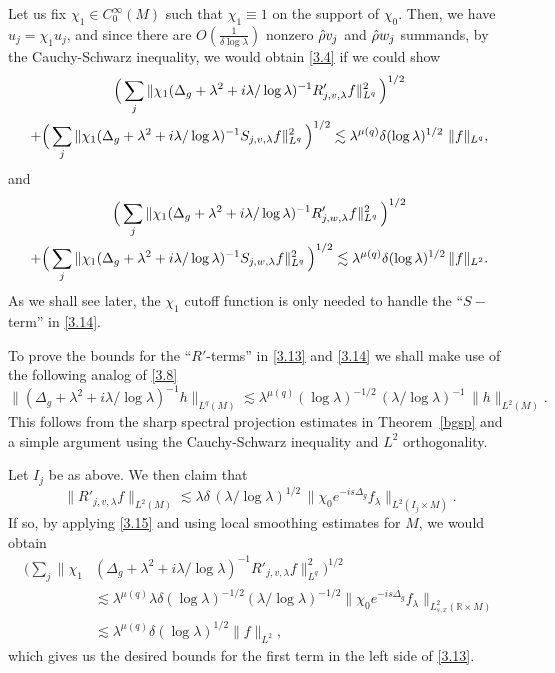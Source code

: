\documentclass[10pt]{amsart}
\newcommand{\la}{\lambda}
\newcommand{\1}{{\bf 1}}
\newcommand{\R}{{\mathbb R}}
\begin{document}
Let us fix $\chi_1\in C_0^\infty (M)$ such that $\chi_1\equiv 1$ on the support of $\chi_0$. Then, we have $u_j=\chi_1u_j$, and  
since there are $O(\frac{1}{\delta\log\la})$ nonzero $\Hat \rho v_j$ and $\Hat \rho w_j$ summands, by the Cauchy-Schwarz
inequality, we would obtain \eqref{3.4} if we could show
\begin{multline}\label{3.13}
\Bigl(\, \sum_j \|\chi_1(\Delta_g+\la^2+i\la/\log\la)^{-1} R'_{j,v,\la}f \|^2_{L^q} \, \Bigr)^{1/2}
\\+
\Bigl(\, \sum_j \|\chi_1(\Delta_g+\la^2+i\la/\log\la)^{-1} S_{j,v,\la}f \|^2_{L^q} \, \Bigr)^{1/2}
\lesssim \la^{\mu(q)}\delta(\log\la)^{1/2} \, \, \|f\|_{L^q},
\end{multline}
and
\begin{multline}\label{3.14}
\Bigl(\, \sum_j \|\chi_1(\Delta_g+\la^2+i\la/\log\la)^{-1} R'_{j,w,\la}f \|^2_{L^q} \, \Bigr)^{1/2}
\\+
\Bigl(\, \sum_j \|\chi_1(\Delta_g+\la^2+i\la/\log\la)^{-1} S_{j,w,\la}f \|^2_{L^q} \, \Bigr)^{1/2}
\lesssim \la^{\mu(q)}\delta(\log\la)^{1/2} \, \|f\|_{L^2}.
\end{multline}
As we shall see later, the $\chi_1$ cutoff function is only needed to handle the ``$S-$term'' in \eqref{3.14}.

To prove the bounds for the ``$R'$-terms'' 
in \eqref{3.13} and \eqref{3.14}
we shall make use of the following analog of \eqref{3.8}
\begin{equation}\label{3.15}
\|(\Delta_g+\la^2+i\la/\log\la)^{-1}h\|_{L^q(M)} \lesssim \la^{\mu(q)}(\log\la)^{-1/2} \, (\la/\log\la)^{-1}\, \|h\|_{L^2(M)}.
\end{equation}
This follows from the sharp spectral projection estimates in Theorem~\ref{bgsp} and a simple argument using the Cauchy-Schwarz inequality and $L^2$ orthogonality.


{Let $I_j$ be as above.} We then claim that
\begin{equation}\label{3.16}
\|R'_{j,v,\la}f\|_{L^2(M)}\lesssim \la\delta \, (\la/\log\la)^{1/2} \, \|\chi_0 e^{-is\Delta_g}f_\la\|_{L^2(I_j\times M)}.
\end{equation}
If so, by applying \eqref{3.15} and using local smoothing estimates for $M$, we would obtain
\begin{align*}
\bigl(\sum_j \|\chi_1 &(\Delta_g+\la^2+i\la/\log\la)^{-1} R'_{j,v,\la}f \|^2_{L^q}\bigr)^{1/2}
\\
& \lesssim \la^{\mu(q)}\la\delta (\log\la)^{-1/2}(\la/\log\la)^{-1/2}
\|\chi_0 e^{-is\Delta_g}f_\la\|_{L^2_{s,x}(\R\times M)}
\\
&\lesssim \la^{\mu(q)}\delta(\log\la)^{1/2}\|f\|_{L^2},
\end{align*}
which  
gives us the desired bounds for the first term in the left side of \eqref{3.13}.
\end{document}
